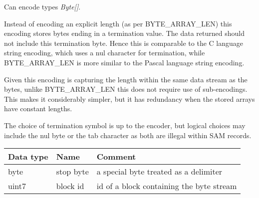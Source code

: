 \documentclass[a4paper]{article}
\begin{document}
Can encode types \textit{Byte[]}.

Instead of encoding an explicit length (as per BYTE\_ARRAY\_LEN) this
encoding stores bytes ending in a termination value.  The data
returned should not include this termination byte.  Hence this is
comparable to the C language string encoding, which uses a nul
character for termination, while BYTE\_ARRAY\_LEN is more similar to
the Pascal language string encoding.

Given this encoding is capturing the length within the same data
stream as the bytes, unlike BYTE\_ARRAY\_LEN this does not require
use of sub-encodings.  This makes it considerably simpler, but it has
redundancy when the stored arrays have constant lengths.

The choice of termination symbol is up to the encoder, but logical
choices may include the nul byte or the tab character as both are
illegal within SAM records.

\begin{tabular}{|>{\raggedright}p{100pt}|>{\raggedright}p{100pt}|>{\raggedright}p{230pt}|}
\hline
\textbf{Data type} & \textbf{Name} & \textbf{Comment}
\tabularnewline
\hline
byte & stop byte & a special byte treated as a delimiter\tabularnewline
\hline
uint7 & block id & id of a block containing the byte stream\tabularnewline
\hline
\end{tabular}
\end{document}
